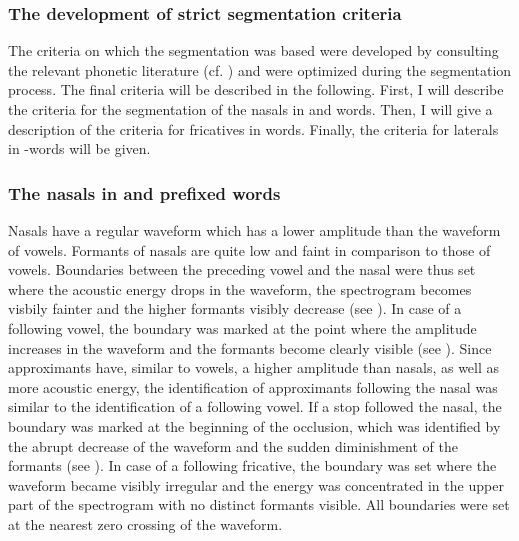\subsubsection{The development of strict segmentation criteria}

The criteria on which the segmentation was based were developed by consulting  the relevant phonetic literature (cf. \citealt{Ladefoged.1996,Johnson.1997b,Ladefoged.2003,Machac.2009,Ladefoged.2011}) and were optimized during the segmentation process. The final criteria will be described in the following. First, I will describe the criteria for the segmentation of the nasals in  and  words. Then, I will give a description of the criteria for fricatives in words. Finally, the criteria for laterals in -words will be given.

\subsubsection{The nasals in  and prefixed words}
Nasals have a regular waveform which has a lower amplitude than the waveform of vowels. Formants of nasals are quite low and faint in comparison to those of vowels. Boundaries between the preceding vowel and the nasal were thus set where the acoustic energy drops in the waveform, the spectrogram becomes visbily fainter and the higher formants visibly decrease (see ). In case of a following vowel, the boundary was marked at the point where the amplitude increases in the waveform and the formants become clearly visible (see ).  Since approximants have, similar to vowels,  a higher amplitude than nasals, as well as more acoustic energy, the identification of approximants following the nasal was similar to the identification of a following vowel. If a stop followed the nasal, the boundary was marked at the beginning of the occlusion, which was identified by the abrupt decrease of the waveform and the sudden diminishment of the formants (see ). In case of a following fricative, the boundary was set where the waveform became visibly irregular and the energy was concentrated in the upper part of the spectrogram with no distinct formants visible. All boundaries were set at the nearest zero crossing of the waveform.



